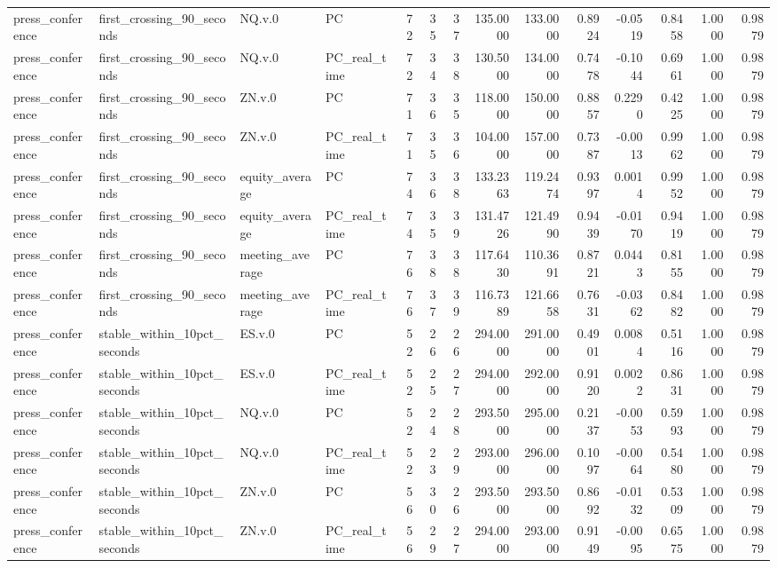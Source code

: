 \begin{tabular}{llllrrrrrrrrrr}
press_conference & first_crossing_90_seconds & NQ.v.0 & PC & 72 & 35 & 37 & 135.0000 & 133.0000 & 0.8924 & -0.0519 & 0.8458 & 1.0000 & 0.9879 \\
press_conference & first_crossing_90_seconds & NQ.v.0 & PC_real_time & 72 & 34 & 38 & 130.5000 & 134.0000 & 0.7478 & -0.1044 & 0.6961 & 1.0000 & 0.9879 \\
press_conference & first_crossing_90_seconds & ZN.v.0 & PC & 71 & 36 & 35 & 118.0000 & 150.0000 & 0.8857 & 0.2290 & 0.4225 & 1.0000 & 0.9879 \\
press_conference & first_crossing_90_seconds & ZN.v.0 & PC_real_time & 71 & 35 & 36 & 104.0000 & 157.0000 & 0.7387 & -0.0013 & 0.9962 & 1.0000 & 0.9879 \\
press_conference & first_crossing_90_seconds & equity_average & PC & 74 & 36 & 38 & 133.2363 & 119.2474 & 0.9397 & 0.0014 & 0.9952 & 1.0000 & 0.9879 \\
press_conference & first_crossing_90_seconds & equity_average & PC_real_time & 74 & 35 & 39 & 131.4726 & 121.4990 & 0.9439 & -0.0170 & 0.9419 & 1.0000 & 0.9879 \\
press_conference & first_crossing_90_seconds & meeting_average & PC & 76 & 38 & 38 & 117.6430 & 110.3691 & 0.8721 & 0.0443 & 0.8155 & 1.0000 & 0.9879 \\
press_conference & first_crossing_90_seconds & meeting_average & PC_real_time & 76 & 37 & 39 & 116.7389 & 121.6658 & 0.7631 & -0.0362 & 0.8482 & 1.0000 & 0.9879 \\
press_conference & stable_within_10pct_seconds & ES.v.0 & PC & 52 & 26 & 26 & 294.0000 & 291.0000 & 0.4901 & 0.0084 & 0.5116 & 1.0000 & 0.9879 \\
press_conference & stable_within_10pct_seconds & ES.v.0 & PC_real_time & 52 & 25 & 27 & 294.0000 & 292.0000 & 0.9120 & 0.0022 & 0.8631 & 1.0000 & 0.9879 \\
press_conference & stable_within_10pct_seconds & NQ.v.0 & PC & 52 & 24 & 28 & 293.5000 & 295.0000 & 0.2137 & -0.0053 & 0.5993 & 1.0000 & 0.9879 \\
press_conference & stable_within_10pct_seconds & NQ.v.0 & PC_real_time & 52 & 23 & 29 & 293.0000 & 296.0000 & 0.1097 & -0.0064 & 0.5480 & 1.0000 & 0.9879 \\
press_conference & stable_within_10pct_seconds & ZN.v.0 & PC & 56 & 30 & 26 & 293.5000 & 293.5000 & 0.8692 & -0.0132 & 0.5309 & 1.0000 & 0.9879 \\
press_conference & stable_within_10pct_seconds & ZN.v.0 & PC_real_time & 56 & 29 & 27 & 294.0000 & 293.0000 & 0.9149 & -0.0095 & 0.6575 & 1.0000 & 0.9879 \\

\end{tabular}
